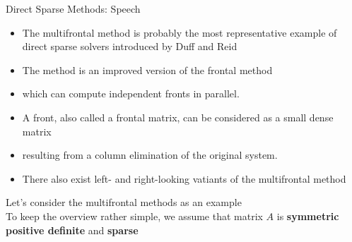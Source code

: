 \begin{frame}[t]{Direct Sparse Methods: Speech}
	\small
	\justifying
	\begin{itemize}
		\item The multifrontal method is probably the most representative example of direct sparse solvers
		 introduced by Duff and Reid
		 
		 \item The method is an improved version of the frontal method 
		 
		 \item which can compute independent fronts in parallel. 
		 
		 \item A front, also called a frontal matrix, can be considered as a small dense matrix 
		 
		 \item resulting from a column elimination of the original system. 
		 
		 \item There also exist left- and right-looking vatiants of the multifrontal method
		 
	\end{itemize}

	\vspace{5mm}
	Let's consider the multifrontal methods as an example\\
	\vspace{2.5mm}
	To keep the overview rather simple, we assume that matrix $A$ is \textbf{symmetric positive definite} and \textbf{sparse}
	
	
	
\end{frame}


